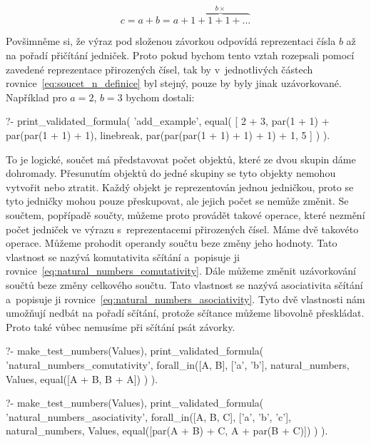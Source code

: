 \begin{equation}
\label{eq:soucet_n_definice}
c = a + b = a + \overbrace{1 + 1 + 1 + ...}^{b \times}
\end{equation}

Povšimněme si, že výraz pod složenou závorkou odpovídá reprezentaci čísla \(b\) až na pořadí přičítání jedniček. Proto pokud bychom tento vztah rozepsali pomocí zavedené reprezentace přirozených čísel, tak by  v~jednotlivých částech rovnice~\eqref{eq:soucet_n_definice} byl stejný, pouze by byly jinak uzávorkované. Například pro \(a=2\), \(b=3\) bychom dostali:

\begin{prolog}
?-	print_validated_formula(
		'add_example',
		equal(
			[
				2 + 3,
				par(1 + 1) + par(par(1 + 1) + 1),
				linebreak,
				par(par(par(1 + 1) + 1) + 1) + 1,
				5
			]
		)
	).
\end{prolog}

To je logické, součet má představovat počet objektů, které ze dvou skupin dáme dohromady. Přesunutím objektů do jedné skupiny se tyto objekty nemohou vytvořit nebo ztratit. Každý objekt je reprezentován jednou jedničkou, proto se tyto jedničky mohou pouze přeskupovat, ale jejich počet se nemůže změnit. Se součtem, popřípadě součty, můžeme proto provádět takové operace, které nezmění počet jedniček ve výrazu s~reprezentacemi přirozených čísel. Máme dvě takovéto operace. Můžeme prohodit operandy součtu beze změny jeho hodnoty. Tato vlastnost se nazývá komutativita sčítání a~popisuje ji rovnice~\eqref{eq:natural_numbers_comutativity}. Dále můžeme změnit uzávorkování součtů beze změny celkového součtu. Tato vlastnost se nazývá asociativita sčítání a~popisuje ji rovnice~\eqref{eq:natural_numbers_asociativity}. Tyto dvě vlastnosti nám umožňují nedbát na pořadí sčítání, protože sčítance můžeme libovolně přeskládat. Proto také vůbec nemusíme při sčítání psát závorky.

\begin{fact}
\begin{prolog}
?-	make_test_numbers(Values),
	print_validated_formula(
		'natural_numbers_comutativity',
		forall_in([A, B], ['a', 'b'], natural_numbers, Values,
			equal([A + B, B + A])
		)
	).
\end{prolog}
\begin{prolog}
?-	make_test_numbers(Values),
	print_validated_formula(
		'natural_numbers_asociativity',
		forall_in([A, B, C], ['a', 'b', 'c'], natural_numbers, Values,
			equal([par(A + B) + C, A + par(B + C)])
		)
	).
\end{prolog}
\end{fact}

